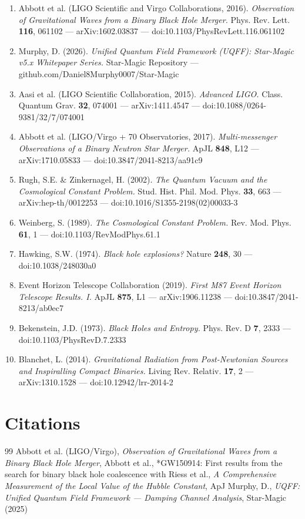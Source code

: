 \documentclass[12pt,a4paper]{article}
\begin{document}
\begin{enumerate}
  \item Abbott et al. (LIGO Scientific and Virgo Collaborations, 2016). \emph{Observation of Gravitational Waves from a Binary Black Hole Merger.} Phys. Rev. Lett. \textbf{116}, 061102 --- arXiv:1602.03837 --- doi:10.1103/PhysRevLett.116.061102
  \item Murphy, D. (2026). \emph{Unified Quantum Field Framework (UQFF): Star-Magic v5.x Whitepaper Series.} Star-Magic Repository --- github.com/Daniel8Murphy0007/Star-Magic
  \item Aasi et al. (LIGO Scientific Collaboration, 2015). \emph{Advanced LIGO.} Class. Quantum Grav. \textbf{32}, 074001 --- arXiv:1411.4547 --- doi:10.1088/0264-9381/32/7/074001
  \item Abbott et al. (LIGO/Virgo + 70 Observatories, 2017). \emph{Multi-messenger Observations of a Binary Neutron Star Merger.} ApJL \textbf{848}, L12 --- arXiv:1710.05833 --- doi:10.3847/2041-8213/aa91c9
  \item Rugh, S.E. \& Zinkernagel, H. (2002). \emph{The Quantum Vacuum and the Cosmological Constant Problem.} Stud. Hist. Phil. Mod. Phys. \textbf{33}, 663 --- arXiv:hep-th/0012253 --- doi:10.1016/S1355-2198(02)00033-3
  \item Weinberg, S. (1989). \emph{The Cosmological Constant Problem.} Rev. Mod. Phys. \textbf{61}, 1 --- doi:10.1103/RevModPhys.61.1
  \item Hawking, S.W. (1974). \emph{Black hole explosions?} Nature \textbf{248}, 30 --- doi:10.1038/248030a0
  \item Event Horizon Telescope Collaboration (2019). \emph{First M87 Event Horizon Telescope Results. I.} ApJL \textbf{875}, L1 --- arXiv:1906.11238 --- doi:10.3847/2041-8213/ab0ec7
  \item Bekenstein, J.D. (1973). \emph{Black Holes and Entropy.} Phys. Rev. D \textbf{7}, 2333 --- doi:10.1103/PhysRevD.7.2333
  \item Blanchet, L. (2014). \emph{Gravitational Radiation from Post-Newtonian Sources and Inspiralling Compact Binaries.} Living Rev. Relativ. \textbf{17}, 2 --- arXiv:1310.1528 --- doi:10.12942/lrr-2014-2
\end{enumerate}


\section*{Citations}
\begin{thebibliography}{99}
 Abbott et al. (LIGO/Virgo), \emph{Observation of Gravitational Waves from a Binary Black Hole Merger},
 Abbott et al., *GW150914: First results from the search for binary black hole coalescence with
 Riess et al., \emph{A Comprehensive Measurement of the Local Value of the Hubble Constant}, ApJ
 Murphy, D., \emph{UQFF: Unified Quantum Field Framework --- Damping Channel Analysis}, Star-Magic (2025)
\end{thebibliography}

\end{document}
